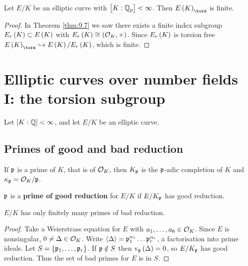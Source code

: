 
\begin{corollary}
\label{cor:9.10}
Let $ E / K $ be an elliptic curve with $ \sbr{K : \QQ_p} < \infty $. Then $ E\br{K}_{\tors} $ is finite.
\end{corollary}

\begin{proof}
In Theorem \ref{thm:9.7} we saw there exists a finite index subgroup $ E_r\br{K} \subset E\br{K} $ with $ E_r\br{K} \cong \br{\OOO_K, +} $. Since $ E_r\br{K} $ is torsion free $ E\br{K}_{\tors} \hookrightarrow E\br{K} / E_r\br{K} $, which is finite.
\end{proof}

\pagebreak

\section{Elliptic curves over number fields I: the torsion subgroup}

Let $ \sbr{K : \QQ} < \infty $, and let $ E / K $ be an elliptic curve.

\subsection{Primes of good and bad reduction}

\begin{notation*}
If $ \mathfrak{p} $ is a prime of $ K $, that is of $ \mathcal{O}_K $, then $ K_{\mathfrak{p}} $ is the $ \mathfrak{p} $-adic completion of $ K $ and $ \kappa_{\mathfrak{p}} = \mathcal{O}_K / \mathfrak{p} $.
\end{notation*}

\begin{definition*}
$ \mathfrak{p} $ is a \textbf{prime of good reduction} for $ E / K $ if $ E / K_{\mathfrak{p}} $ has good reduction.
\end{definition*}

\begin{lemma}
$ E / K $ has only finitely many primes of bad reduction.
\end{lemma}

\begin{proof}
Take a Weierstrass equation for $ E $ with $ a_1, \dots, a_6 \in \mathcal{O}_K $. Since $ E $ is nonsingular, $ 0 \ne \Delta \in \mathcal{O}_K $. Write $ \left\langle \Delta \right\rangle = \mathfrak{p}_1^{\alpha_1} \dots \mathfrak{p}_r^{\alpha_r} $, a factorisation into prime ideals. Let $ S = \cbr{\ppp_1, \dots, \ppp_r} $. If $ \mathfrak{p} \notin S $ then $ \v_\ppp\br{\Delta} = 0 $, so $ E / K_{\mathfrak{p}} $ has good reduction. Thus the set of bad primes for $ E $ is in $ S $.
\end{proof}

